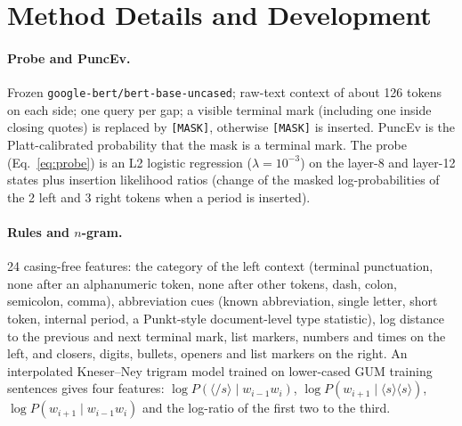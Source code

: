 
\section{Method Details and Development}
\label{app:method}

\paragraph{Probe and PuncEv.} Frozen \texttt{google-bert/bert-base-uncased}; raw-text context of about 126 tokens on
each side; one query per gap; a visible terminal mark (including one inside closing quotes) is replaced by
\texttt{[MASK]}, otherwise \texttt{[MASK]} is inserted. PuncEv is the Platt-calibrated probability that the mask is a
terminal mark. The probe (Eq.~\ref{eq:probe}) is an L2 logistic regression ($\lambda = 10^{-3}$) on the layer-8 and
layer-12 states plus insertion likelihood ratios (change of the masked log-probabilities of the 2 left and 3 right tokens
when a period is inserted).

\paragraph{Rules and $n$-gram.} 24 casing-free features: the category of the left context (terminal punctuation, none
after an alphanumeric token, none after other tokens, dash, colon, semicolon, comma), abbreviation cues (known
abbreviation, single letter, short token, internal period, a Punkt-style document-level type statistic), log distance
to the previous and next terminal mark, list markers, numbers and times on the left, and closers, digits, bullets,
openers and list markers on the right. An interpolated Kneser--Ney trigram model \citep{kneser-ney-1995-improved,chen-goodman-1999-empirical}
 trained on lower-cased GUM training sentences gives four features: $\log P(\langle/s\rangle
\mid w_{i-1} w_i)$, $\log P(w_{i+1} \mid \langle s\rangle\langle s\rangle)$, $\log P(w_{i+1} \mid w_{i-1} w_i)$ and the
log-ratio of the first two to the third.

